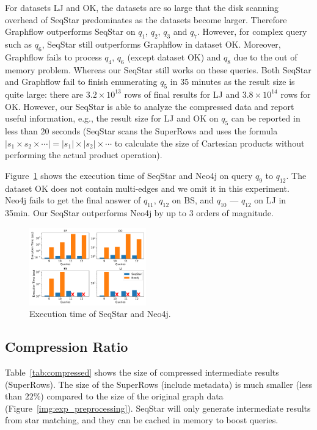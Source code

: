 For datasets LJ and OK, the datasets are so large that the disk scanning overhead of SeqStar predominates as the datasets become larger.
Therefore Graphflow outperforms SeqStar on $q_1$, $q_2$, $q_3$ and $q_7$.
However, for complex query such as $q_6$, SeqStar still outperforms Graphflow in dataset OK\@.
Moreover, Graphflow fails to process $q_4$, $q_6$ (except dataset OK) and $q_8$ due to the out of memory problem.
Whereas our SeqStar still works on these queries.
Both SeqStar and Graphflow fail to finish enumerating $q_5$ in 35 minutes as the result size is quite large:
there are $3.2 \times 10^{13}$ rows of final results for LJ and $3.8 \times 10^{14}$ rows for OK\@.
However, our SeqStar is able to analyze the compressed data and report useful information,
e.g., the result size for LJ and OK on $q_5$ can be reported in less than 20 seconds
(SeqStar scans the SuperRows and uses the formula $|s_1 \times s_2 \times \cdots| = |s_1| \times |s_2| \times \cdots$ to calculate the size of Cartesian products without performing the actual product operation).

Figure~\ref{img:exp_compare_neo4j} shows the execution time of SeqStar and Neo4j on query $q_9$ to $q_{12}$.
The dataset OK does not contain multi-edges and we omit it in this experiment.
Neo4j fails to get the final answer of $q_{11}$, $q_{12}$ on BS, and $q_{10}$ --- $q_{12}$ on LJ in 35min.
Our SeqStar outperforms Neo4j by up to 3 orders of magnitude.
\begin{figure}[ht]
  \centering
  \includegraphics[width=0.45\textwidth]{img/exp_compare_neo4j.pdf}
  \caption{Execution time of SeqStar and Neo4j.}\label{img:exp_compare_neo4j}
\end{figure}
\subsection{Compression Ratio}\label{sec:experiments_compress}
Table~\ref{tab:compressed} shows the size of compressed intermediate results (SuperRows).
The size of the SuperRows (include metadata) is much smaller (less than $22\%$) compared to the size of the original graph data (Figure~\ref{img:exp_preprocessing}).
SeqStar will only generate intermediate results from star matching,
and they can be cached in memory to boost queries.

